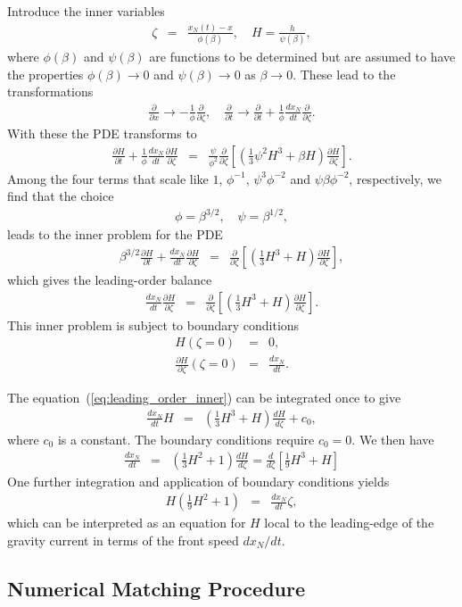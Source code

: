 \documentclass[11pt]{article}
\newcommand{\bea}{\begin{eqnarray}}
\newcommand{\eea}{\end{eqnarray}}
\begin{document}
Introduce the inner variables
\bea
\zeta & = & \frac{x_N(t) - x}{\phi(\beta)},\quad
H = \frac{h}{\psi(\beta)},
\eea
where $\phi(\beta)$ and $\psi(\beta)$ are functions to be determined but are assumed to have the properties 
$\phi(\beta) \rightarrow 0$ and $\psi(\beta) \rightarrow 0$ as $\beta \rightarrow 0$.  These lead to the transformations
\bea
\frac{\partial}{\partial x}  \rightarrow  - \frac{1}{\phi} \frac{\partial}{\partial \zeta},\quad
\frac{\partial}{\partial t}  \rightarrow  \frac{\partial}{\partial t} + \frac{1}{\phi} \frac{dx_N}{dt} \frac{\partial}{\partial \zeta}.
\eea
With these the PDE transforms to
\bea
\frac{\partial H}{\partial t} + \frac{1}{\phi} \frac{dx_N}{dt} \frac{\partial H}{\partial \zeta} & = & \frac{\psi}{\phi^2} \frac{\partial}{\partial \zeta} 
\left[ \left( \frac{1}{3} \psi^2 H^3 + \beta H \right) \frac{\partial H}{\partial \zeta} \right].
\eea
Among the four terms that scale like $1$, $\phi^{-1}$, $\psi^3 \phi^{-2}$ and $\psi \beta \phi^{-2}$, respectively, we find that the choice
\bea
\phi = \beta^{3/2},\quad
\psi = \beta^{1/2},
\eea
leads to the inner problem for the PDE
\bea
\beta^{3/2} \frac{\partial H}{\partial t} + \frac{dx_N}{dt} \frac{\partial H}{\partial \zeta} & = & \frac{\partial}{\partial \zeta} 
\left[ \left( \frac{1}{3} H^3 + H \right) \frac{\partial H}{\partial \zeta} \right],
\eea
which gives the leading-order balance
\bea
\label{eq:leading_order_inner}
\frac{dx_N}{dt} \frac{\partial H}{\partial \zeta} & = & \frac{\partial}{\partial \zeta} 
\left[ \left( \frac{1}{3} H^3 + H \right) \frac{\partial H}{\partial \zeta} \right].
\eea
This inner problem is subject to boundary conditions 
\bea
H(\zeta=0) & = & 0, \\
\frac{\partial H}{\partial \zeta}(\zeta=0) & = & \frac{dx_N}{dt}.
\eea

The equation~(\ref{eq:leading_order_inner}) can be integrated once to give
\bea
\frac{dx_N}{dt} H & = & \left( \frac{1}{3} H^3 + H \right) \frac{dH}{d\zeta} + c_0,
\eea
where $c_0$ is a constant.  The boundary conditions require $c_0=0$.  We then have
\bea
\frac{dx_N}{dt} & = & \left( \frac{1}{3} H^2 + 1 \right) \frac{dH}{d\zeta} = \frac{d}{d\zeta} \left[ \frac{1}{9} H^3 + H \right]
\eea
One further integration and application of boundary conditions yields
\bea
\label{eq:inner_solution}
H \left( \frac{1}{9} H^2 + 1 \right) & = & \frac{dx_N}{dt} \zeta,
\eea
which can be interpreted as an equation for $H$ local to the leading-edge of the gravity current in terms of the front speed $dx_N/dt$.

\subsection{Numerical Matching Procedure}
\end{document}
